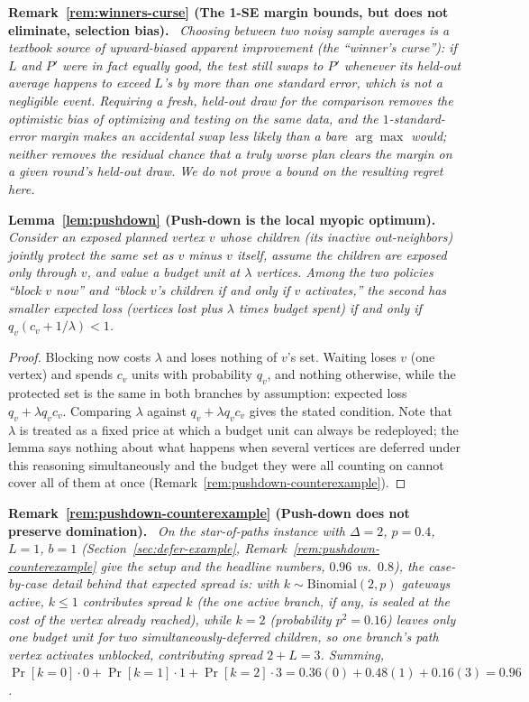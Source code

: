\documentclass[preprint,11pt]{elsarticle}
\theoremstyle{definition}
\theoremstyle{remark}
\newenvironment{repeatlemma}[1][]{\par\medskip\noindent\textbf{#1.}\ \itshape}{\par\medskip}
\newenvironment{repeatremark}[1][]{\par\medskip\noindent\textbf{#1.}\ \itshape}{\par\medskip}
\begin{document}
\begin{repeatremark}[Remark~\ref{rem:winners-curse} (The 1-SE margin bounds, but does not eliminate, selection bias)]
Choosing between two noisy sample averages is a textbook source of
upward-biased apparent improvement (the ``winner's curse''): if $L$ and
$P'$ were in fact equally good, the test still swaps to $P'$ whenever its
held-out average happens to exceed $L$'s by more than one standard error,
which is not a negligible event. Requiring a fresh, held-out draw for the
comparison removes the optimistic bias of optimizing and testing on the
same data, and the $1$-standard-error margin makes an accidental swap less
likely than a bare $\arg\max$ would; neither removes the residual chance
that a truly worse plan clears the margin on a given round's held-out
draw. We do not prove a bound on the resulting regret here.
\end{repeatremark}

\begin{repeatlemma}[Lemma~\ref{lem:pushdown} (Push-down is the local myopic optimum)]
Consider an exposed planned vertex $v$ whose children (its inactive
out-neighbors) jointly protect the same set as $v$ minus $v$ itself, assume
the children are exposed only through $v$, and value a budget unit at
$\lambda$ vertices. Among the two policies ``block $v$ now'' and ``block
$v$'s children if and only if $v$ activates,'' the second has smaller
expected loss (vertices lost plus $\lambda$ times budget spent) if and only
if $q_v(c_v+1/\lambda)<1$.
\end{repeatlemma}
\begin{proof}
Blocking now costs $\lambda$ and loses nothing of $v$'s set. Waiting loses
$v$ (one vertex) and spends $c_v$ units with probability $q_v$, and nothing
otherwise, while the protected set is the same in both branches by
assumption: expected loss $q_v+\lambda q_v c_v$. Comparing $\lambda$ against
$q_v+\lambda q_v c_v$ gives the stated condition. Note that $\lambda$ is
treated as a fixed price at which a budget unit can always be redeployed;
the lemma says nothing about what happens when several vertices are
deferred under this reasoning simultaneously and the budget they were all
counting on cannot cover all of them at once
(Remark~\ref{rem:pushdown-counterexample}).
\end{proof}

\begin{repeatremark}[Remark~\ref{rem:pushdown-counterexample} (Push-down does not preserve domination)]
On the star-of-paths instance with $\Delta=2$, $p=0.4$, $L=1$, $b=1$
(Section~\ref{sec:defer-example}, Remark~\ref{rem:pushdown-counterexample}
give the setup and the headline numbers, $0.96$ vs.\ $0.8$), the
case-by-case detail behind that expected spread is: with
$k\sim\mathrm{Binomial}(2,p)$ gateways active, $k\le1$ contributes spread
$k$ (the one active branch, if any, is sealed at the cost of the vertex
already reached), while $k=2$ (probability $p^2=0.16$) leaves only one
budget unit for two simultaneously-deferred children, so one branch's
path vertex activates unblocked, contributing spread $2+L=3$. Summing,
$\Pr[k{=}0]\cdot0+\Pr[k{=}1]\cdot1+\Pr[k{=}2]\cdot3=0.36(0)+0.48(1)+0.16(3)=0.96$.
\end{repeatremark}
\end{document}
